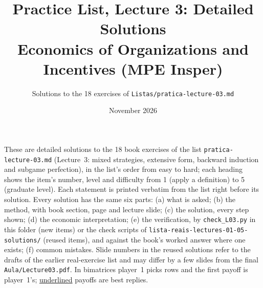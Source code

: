 \documentclass[11pt,a4paper]{article}
\title{\textbf{Practice List, Lecture 3: Detailed Solutions}\\[4pt]
  \large Economics of Organizations and Incentives (MPE Insper)}
\author{Solutions to the 18 exercises of \texttt{Listas/pratica-lecture-03.md}}
\date{November 2026}
\begin{document}
\maketitle
\thispagestyle{empty}

\noindent\sloppy These are detailed solutions to the 18 book exercises of the list
\texttt{pratica-lecture-03.md} (Lecture~3: mixed strategies, extensive form, backward induction and
subgame perfection), in the list's order from easy to hard; each heading shows the item's number,
level and difficulty from 1 (apply a definition) to 5 (graduate level). Each statement is printed verbatim from the list
right before its solution. Every solution has the same six parts: (a) what is asked; (b) the method, with
book section, page and lecture slide; (c) the solution, every step shown; (d) the economic
interpretation; (e) the verification, by \texttt{check\_L03.py} in this folder (new items) or the check
scripts of \texttt{lista-reais-lectures-01-05-solutions/} (reused items), and against the book's worked
answer where one exists; (f) common mistakes. Slide numbers in the reused solutions refer to the
drafts of the earlier real-exercise list and may differ by a few slides from the final
\texttt{Aula/Lecture03.pdf}. In bimatrices player~1 picks rows and the first payoff is player~1's;
\underline{underlined} payoffs are best replies.

\tableofcontents

\sollecture{\lectureiiititle}
\itemsiii
\end{document}
